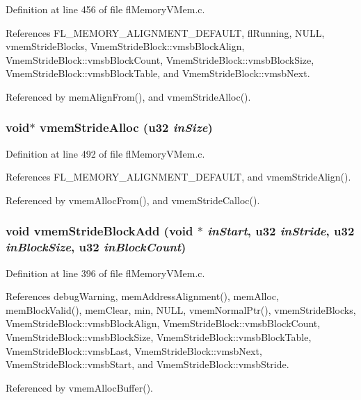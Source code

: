 Definition at line 456 of file fl\-Memory\-VMem.c.

References FL\_\-MEMORY\_\-ALIGNMENT\_\-DEFAULT, fl\-Running, NULL, vmem\-Stride\-Blocks, Vmem\-Stride\-Block::vmsb\-Block\-Align, Vmem\-Stride\-Block::vmsb\-Block\-Count, Vmem\-Stride\-Block::vmsb\-Block\-Size, Vmem\-Stride\-Block::vmsb\-Block\-Table, and Vmem\-Stride\-Block::vmsb\-Next.

Referenced by mem\-Align\-From(), and vmem\-Stride\-Alloc().
\subsubsection{\setlength{\rightskip}{0pt plus 5cm}void$\ast$ vmem\-Stride\-Alloc (u32 {\em in\-Size})}\label{flMemoryVMem_8c_dfe51ec95e7145599cf42de9e54f390b}




Definition at line 492 of file fl\-Memory\-VMem.c.

References FL\_\-MEMORY\_\-ALIGNMENT\_\-DEFAULT, and vmem\-Stride\-Align().

Referenced by vmem\-Alloc\-From(), and vmem\-Stride\-Calloc().
\subsubsection{\setlength{\rightskip}{0pt plus 5cm}void vmem\-Stride\-Block\-Add (void $\ast$ {\em in\-Start}, u32 {\em in\-Stride}, u32 {\em in\-Block\-Size}, u32 {\em in\-Block\-Count})}\label{flMemoryVMem_8c_a642a6370458c1f3b28e42ed4fa1876c}




Definition at line 396 of file fl\-Memory\-VMem.c.

References debug\-Warning, mem\-Address\-Alignment(), mem\-Alloc, mem\-Block\-Valid(), mem\-Clear, min, NULL, vmem\-Normal\-Ptr(), vmem\-Stride\-Blocks, Vmem\-Stride\-Block::vmsb\-Block\-Align, Vmem\-Stride\-Block::vmsb\-Block\-Count, Vmem\-Stride\-Block::vmsb\-Block\-Size, Vmem\-Stride\-Block::vmsb\-Block\-Table, Vmem\-Stride\-Block::vmsb\-Last, Vmem\-Stride\-Block::vmsb\-Next, Vmem\-Stride\-Block::vmsb\-Start, and Vmem\-Stride\-Block::vmsb\-Stride.

Referenced by vmem\-Alloc\-Buffer().
